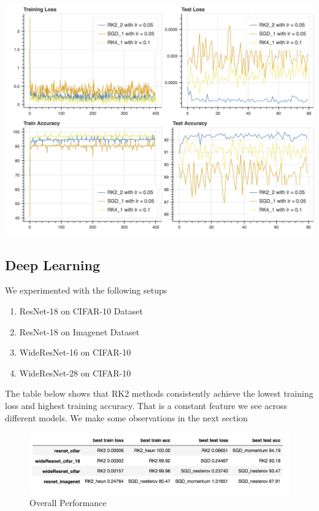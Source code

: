 \\
\includegraphics[scale=0.4]{lasso_1.png}
\\



\subsection{Deep Learning}

We experimented with the following setups
\begin{enumerate}
\item ResNet-18 on CIFAR-10 Dataset
\item ResNet-18 on Imagenet Dataset
\item WideResNet-16 on CIFAR-10
\item WideResNet-28 on CIFAR-10
\end{enumerate}

The table below shows that RK2 methods consistently achieve
the lowest training loss and highest training accuracy.
That is a constant feature we see across different models.
We make some observations in the next section
\begin{figure}[htb]
\centering
\includegraphics[scale=0.5]{non_param_test.png}
\caption{Overall Performance}
\label{fig:non_param_test}
\end{figure}


